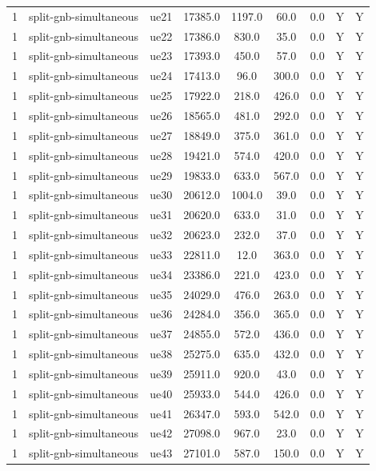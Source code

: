 \begin{table}[ht]
\begin{tabular}{|c|c|c|c|c|c|c|c|c|}
1 & split-gnb-simultaneous & ue21 & 17385.0 & 1197.0 & 60.0 & 0.0 & Y & Y \\
1 & split-gnb-simultaneous & ue22 & 17386.0 & 830.0 & 35.0 & 0.0 & Y & Y \\
1 & split-gnb-simultaneous & ue23 & 17393.0 & 450.0 & 57.0 & 0.0 & Y & Y \\
1 & split-gnb-simultaneous & ue24 & 17413.0 & 96.0 & 300.0 & 0.0 & Y & Y \\
1 & split-gnb-simultaneous & ue25 & 17922.0 & 218.0 & 426.0 & 0.0 & Y & Y \\
1 & split-gnb-simultaneous & ue26 & 18565.0 & 481.0 & 292.0 & 0.0 & Y & Y \\
1 & split-gnb-simultaneous & ue27 & 18849.0 & 375.0 & 361.0 & 0.0 & Y & Y \\
1 & split-gnb-simultaneous & ue28 & 19421.0 & 574.0 & 420.0 & 0.0 & Y & Y \\
1 & split-gnb-simultaneous & ue29 & 19833.0 & 633.0 & 567.0 & 0.0 & Y & Y \\
1 & split-gnb-simultaneous & ue30 & 20612.0 & 1004.0 & 39.0 & 0.0 & Y & Y \\
1 & split-gnb-simultaneous & ue31 & 20620.0 & 633.0 & 31.0 & 0.0 & Y & Y \\
1 & split-gnb-simultaneous & ue32 & 20623.0 & 232.0 & 37.0 & 0.0 & Y & Y \\
1 & split-gnb-simultaneous & ue33 & 22811.0 & 12.0 & 363.0 & 0.0 & Y & Y \\
1 & split-gnb-simultaneous & ue34 & 23386.0 & 221.0 & 423.0 & 0.0 & Y & Y \\
1 & split-gnb-simultaneous & ue35 & 24029.0 & 476.0 & 263.0 & 0.0 & Y & Y \\
1 & split-gnb-simultaneous & ue36 & 24284.0 & 356.0 & 365.0 & 0.0 & Y & Y \\
1 & split-gnb-simultaneous & ue37 & 24855.0 & 572.0 & 436.0 & 0.0 & Y & Y \\
1 & split-gnb-simultaneous & ue38 & 25275.0 & 635.0 & 432.0 & 0.0 & Y & Y \\
1 & split-gnb-simultaneous & ue39 & 25911.0 & 920.0 & 43.0 & 0.0 & Y & Y \\
1 & split-gnb-simultaneous & ue40 & 25933.0 & 544.0 & 426.0 & 0.0 & Y & Y \\
1 & split-gnb-simultaneous & ue41 & 26347.0 & 593.0 & 542.0 & 0.0 & Y & Y \\
1 & split-gnb-simultaneous & ue42 & 27098.0 & 967.0 & 23.0 & 0.0 & Y & Y \\
1 & split-gnb-simultaneous & ue43 & 27101.0 & 587.0 & 150.0 & 0.0 & Y & Y \\

\end{tabular}
\end{table}
